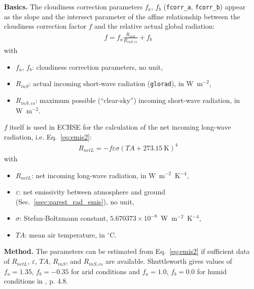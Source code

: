 \documentclass{scrreprt}
\newenvironment{denseitem}{
  \begin{itemize}
    \setlength{\itemsep}{0pt}
    \setlength{\parskip}{0pt}
    \setlength{\parsep}{0pt}
}{
  \end{itemize}
}
\begin{document}
\textbf{Basics.}
The cloudiness correction parameters $f_a$, $f_b$ (\verb!fcorr_a!, \verb!fcorr_b!) appear as the slope and the intersect parameter of the affine relationship between the cloudiness correction factor $f$ and the relative actual global radiation:
\begin{align} \label{eq:fcorr1}
  f = f_a \frac{R_{inS}}{R_{inS,cs}} + f_b
\end{align}
%
with
\begin{denseitem}
  \item[] $f_a$, $f_b$: cloudiness correction parameters, no unit,
  \item[] $R_{inS}$: actual incoming short-wave radiation (\verb!glorad!), in W~m$^{-2}$,
  \item[] $R_{inS,cs}$: maximum possible (``clear-sky'') incoming short-wave radiation, in W~m$^{-2}$.
\end{denseitem}
%
$f$ itself is used in ECHSE for the calculation of the net incoming long-wave radiation, i.e. Eq.~\eqref{eq:emis2}:
\begin{align*}
  R_{netL} = -f \varepsilon \sigma (TA + 273.15~\text{K})^4
\end{align*}
%
with
\begin{denseitem}
  \item[] $R_{netL}$: net incoming long-wave radiation, in W~m$^{-2}$~K$^{-4}$,
  \item[] $\varepsilon$: net emissivity between atmosphere and ground (Sec.~\ref{ssec:parest_rad_emis}), no unit,
  \item[] $\sigma$: Stefan-Boltzmann constant, $5.670373 \times 10^{-8}$~W~m$^{-2}$~K$^{-4}$,
  \item[] $TA$: mean air temperature, in $^\circ$C.
\end{denseitem}

\noindent
\textbf{Method.}
The parameters can be estimated from Eq.~\eqref{eq:emis2} if sufficient data of $R_{netL}$, $\varepsilon$, $TA$, $R_{inS}$, and $R_{inS,cs}$ are available.
Shuttleworth gives values of $f_a = 1.35$, $f_b = -0.35$ for arid conditions and $f_a = 1.0$, $f_b = 0.0$ for humid conditions in \citet{maidment93}, p. 4.8.
\end{document}

